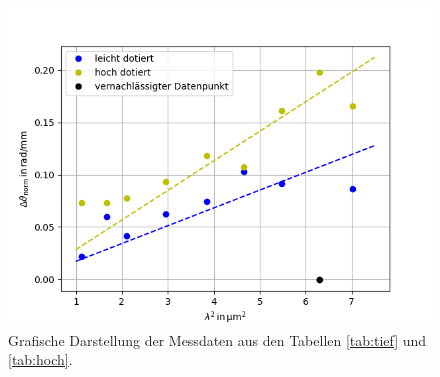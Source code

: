 \begin{figure}[h!]
  \centering
  \includegraphics[scale=0.7]{fig/deltaTheta.png}
  \caption{Grafische Darstellung der Messdaten aus den Tabellen \ref{tab:tief} und \ref{tab:hoch}.}
  \label{abb:delta}
\end{figure}
